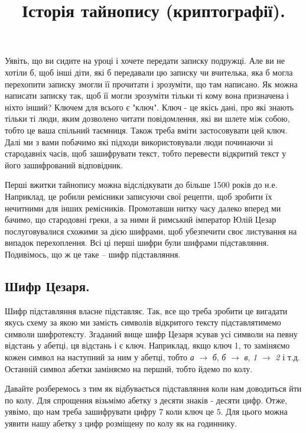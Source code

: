 \documentclass{book}
\title{Історія тайнопису (криптографії).}
\begin{document}
\maketitle

Уявіть, що ви сидите на уроці і хочете передати записку подружці. Але ви не
хотіли б, щоб інші діти, які б передавали цю записку чи вчителька, яка б могла
перехопити записку змогли її прочитати і зрозуміти, що там написано. Як можна
написати записку так, щоб її могли зрозуміти тільки ті кому вона призначена і
ніхто інший? Ключем для всього є "ключ". Ключ - це якісь дані, про які знають
тільки ті люди, яким дозволено читати повідомлення, які ви шлете між собою,
тобто це ваша спільний таємниця. Також треба вміти застосовувати цей ключ. Далі
ми з вами побачимо які підходи використовували люди починаючи зі стародавніх
часів, щоб зашифрувати текст, тобто перевести відкритий текст у його
зашифрований відповідник.

Перші вжитки тайнопису можна відслідкувати до більше 1500 років до н.е.
Наприклад, це робили ремісники записуючи свої рецепти, щоб зробити їх нечитними
для інших ремісників. Промотавши нитку часу далеко вперед ми бачимо, що
стародовні греки, а за ними й римський імператор Юлій Цезар послуговувалися
схожими за дією шифрами, щоб убезпечити своє листування на випадок
перехоплення. Всі ці перші шифри були шифрами підставляння. Подивімось, що ж це
таке -- шифр підставляння.

\subsection*{Шифр Цезаря.}

Шифр підставляння власне підставляє. Так, все що треба зробити це вигадати
якусь схему за якою ми замість символів відкритого тексту підставлятимемо
символи шифротексту. Згаданий вище шифр Цезаря зсував усі символи на певну
відстань у абетці, ця відстань і є ключ. Наприклад, якщо ключ 1, то заміняємо
кожен символ на наступний за ним у абетці, тобто \emph{а} $\to$ \emph{б},
\emph{б} $\to$ \emph{в}, \emph{1} $\to$ \emph{2} і т.д. Останній символ абетки
заміняємо на перший, тобто йдемо по колу.

Давайте розберемось з тим як відбувається підставляння коли нам доводиться йти
по колу. Для спрощення візьмімо абетку з десяти знаків - десяти цифр. Отже,
уявімо, що нам треба зашифрувати цифру $7$ коли ключ це $5$. Для цього можна уявити
нашу абетку з цифр розміщену по колу як на годиннику.
\end{document}
